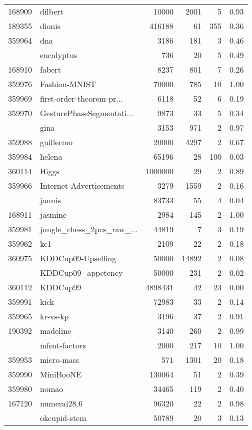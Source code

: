 \begin{longtable}{rlrrrp{2em}}
168909 & dilbert & 10000 & 2001 & 5 & 0.93 \\
189355 & dionis & 416188 & 61 & 355 & 0.36 \\
359964 & dna & 3186 & 181 & 3 & 0.46 \\
\addlinespace
359954 & eucalyptus & 736 & 20 & 5 & 0.49 \\
168910 & fabert & 8237 & 801 & 7 & 0.26 \\
359976 & Fashion-MNIST & 70000 & 785 & 10 & 1.00 \\
359969 & first-order-theorem-pr... & 6118 & 52 & 6 & 0.19 \\
359970 & GesturePhaseSegmentati... & 9873 & 33 & 5 & 0.34 \\
\addlinespace
189922 & gina & 3153 & 971 & 2 & 0.97 \\
359988 & guillermo & 20000 & 4297 & 2 & 0.67 \\
359984 & helena & 65196 & 28 & 100 & 0.03 \\
360114 & Higgs & 1000000 & 29 & 2 & 0.89 \\
359966 & Internet-Advertisements & 3279 & 1559 & 2 & 0.16 \\
\addlinespace
211979 & jannis & 83733 & 55 & 4 & 0.04 \\
168911 & jasmine & 2984 & 145 & 2 & 1.00 \\
359981 & jungle\_chess\_2pcs\_raw\_... & 44819 & 7 & 3 & 0.19 \\
359962 & kc1 & 2109 & 22 & 2 & 0.18 \\
360975 & KDDCup09-Upselling & 50000 & 14892 & 2 & 0.08 \\
\addlinespace
3945 & KDDCup09\_appetency & 50000 & 231 & 2 & 0.02 \\
360112 & KDDCup99 & 4898431 & 42 & 23 & 0.00 \\
359991 & kick & 72983 & 33 & 2 & 0.14 \\
359965 & kr-vs-kp & 3196 & 37 & 2 & 0.91 \\
190392 & madeline & 3140 & 260 & 2 & 0.99 \\
\addlinespace
359961 & mfeat-factors & 2000 & 217 & 10 & 1.00 \\
359953 & micro-mass & 571 & 1301 & 20 & 0.18 \\
359990 & MiniBooNE & 130064 & 51 & 2 & 0.39 \\
359980 & nomao & 34465 & 119 & 2 & 0.40 \\
167120 & numerai28.6 & 96320 & 22 & 2 & 0.98 \\
\addlinespace
359993 & okcupid-stem & 50789 & 20 & 3 & 0.13 \\

\end{longtable}
